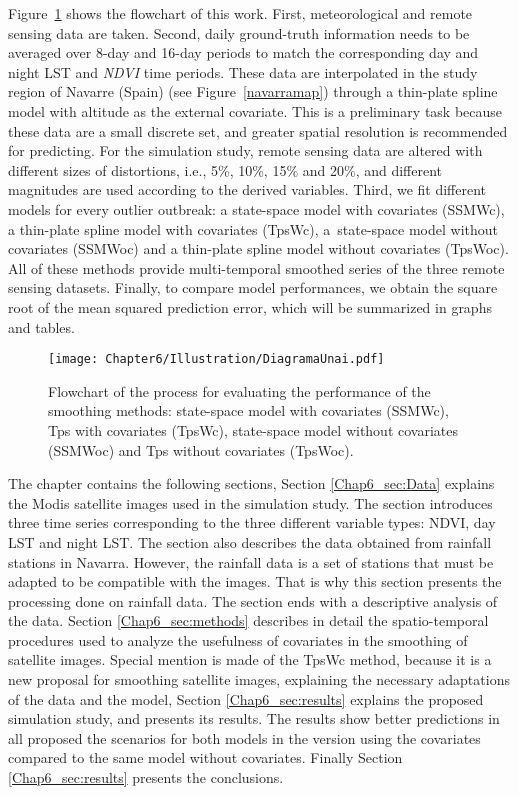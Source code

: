 Figure~\ref{Chap6:diagrama} shows the flowchart of this work. First, meteorological and remote sensing data are taken. Second, daily ground-truth information needs to be averaged over 8-day and 16-day periods to match the corresponding day and night LST and \emph{NDVI} time periods. These data are interpolated in the study region of Navarre (Spain) (see Figure~\ref{navarramap}) through a thin-plate spline model with altitude as the external covariate. This is a preliminary task because these data are a small discrete set, and greater spatial resolution is recommended for predicting. For the simulation study, remote sensing data are altered with different sizes of distortions, i.e., 5\%, 10\%, 15\% and 20\%, and different magnitudes are used according to the derived variables. Third, we fit different models for every outlier outbreak: a state-space model with covariates (SSMWc), a thin-plate spline model with covariates (TpsWc), a~state-space model without covariates (SSMWoc) and a thin-plate spline model without covariates (TpsWoc). All of these methods provide multi-temporal smoothed series of the three remote sensing datasets. Finally, to compare model performances, we obtain the square root of the mean squared prediction error, which will be summarized in graphs and tables.


\begin{figure}[ht]
\centering
    \texttt{[image: Chapter6/Illustration/DiagramaUnai.pdf]}  \vspace{-6pt}
    	\caption{Flowchart of the process for evaluating the performance of the smoothing methods: state-space model with covariates (SSMWc),
    Tps with covariates (TpsWc), state-space model without covariates (SSMWoc) and Tps without covariates (TpsWoc).}\label{Chap6:diagrama}
\end{figure}

The chapter contains the following sections, Section \ref{Chap6_sec:Data} explains the Modis satellite images used in the simulation study. The section introduces three time series corresponding to the three different variable types: NDVI, day LST and night LST. The section also describes the data obtained from rainfall stations in Navarra. However, the rainfall data is a set of stations that must be adapted to be compatible with the images. That is why this section presents the processing done on rainfall data. The section ends with a descriptive analysis of the data. Section \ref{Chap6_sec:methods} describes in detail the spatio-temporal procedures used to analyze the usefulness of covariates in the smoothing of satellite images. Special mention is made of the TpsWc method, because it is a new proposal for smoothing satellite images, explaining the necessary adaptations of the data and the model, Section \ref{Chap6_sec:results} explains the proposed simulation study, and presents its results. The results show better predictions in all proposed the scenarios for both models in the version using the covariates compared to the same model without covariates. Finally Section \ref{Chap6_sec:results} presents the conclusions.

